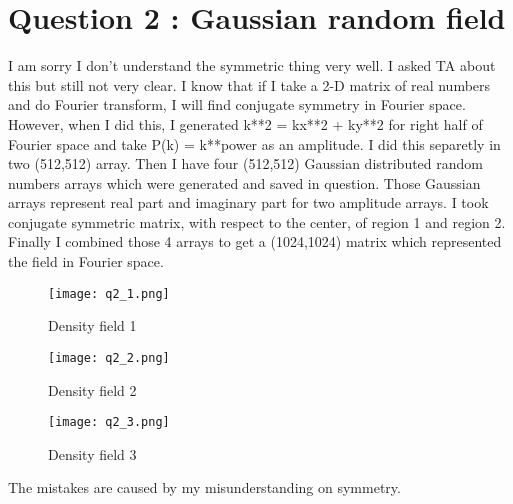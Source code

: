 \section{Question 2 : Gaussian random field}
I am sorry I don't understand the symmetric thing very well. I asked TA about this but still not very clear. I know that if I take a 2-D matrix of real numbers and do Fourier transform, I will find conjugate symmetry in Fourier space. However, when I did this, I generated k**2 = kx**2 + ky**2 for right half of Fourier space and take P(k) = k**power as an amplitude. I did this separetly in two (512,512) array. 
Then I have four (512,512) Gaussian distributed random numbers arrays which were generated and saved in question.
Those Gaussian arrays represent real part and imaginary part for two amplitude arrays. I took conjugate symmetric matrix, with respect to the center, of region 1 and region 2. Finally I combined those 4 arrays to get a (1024,1024) matrix which represented 
the field in Fourier space.



\begin{figure}
  \centering
  \texttt{[image: q2\_1.png]}
  \caption{Density field 1}
  \label{fig:q2_1} 
\end{figure}

\begin{figure}
  \centering
  \texttt{[image: q2\_2.png]}
  \caption{Density field 2}
  \label{fig:q2_2} 
\end{figure}


\begin{figure}
  \centering
  \texttt{[image: q2\_3.png]}
  \caption{Density field 3}
  \label{fig:q2_3} 
\end{figure}

The mistakes are caused by my misunderstanding on symmetry.
